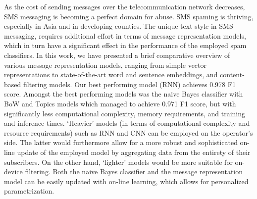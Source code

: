 \documentclass[letterpaper]{article}
\begin{document}
As the cost of sending messages over the telecommunication network decreases, SMS messaging is becoming a perfect domain for abuse. SMS spaming is thriving, especially in Asia and in developing counties. The unique text style in SMS messaging, requires additional effort in terms of message representation models, which in turn have a significant effect in the performance of the employed spam classifiers. In this work, we have presented a brief comparative overview of various message representation models, ranging from simple vector representations to state-of-the-art word and sentence embeddings, and content-based filtering models. Our best performing model (RNN) achieves 0.978 F1 score. Amongst the best performing models was the naive Bayes classifier with BoW and Topics models which managed to achieve 0.971 F1 score, but with significantly less computational complexity, memory requirements, and training and inference times. `Heavier' models (in terms of computational complexity and resource requirements) such as RNN and CNN can be employed on the operator's side. The latter would furthermore allow for a more robust and sophisticated on-line update of the employed model by aggregating data from the entirety of their subscribers. On the other hand, `lighter' models would be more suitable for on-device filtering. Both the naive Bayes classifier and the message representation model can be easily updated with on-line learning, which allows for personalized parametrization.
\end{document}
